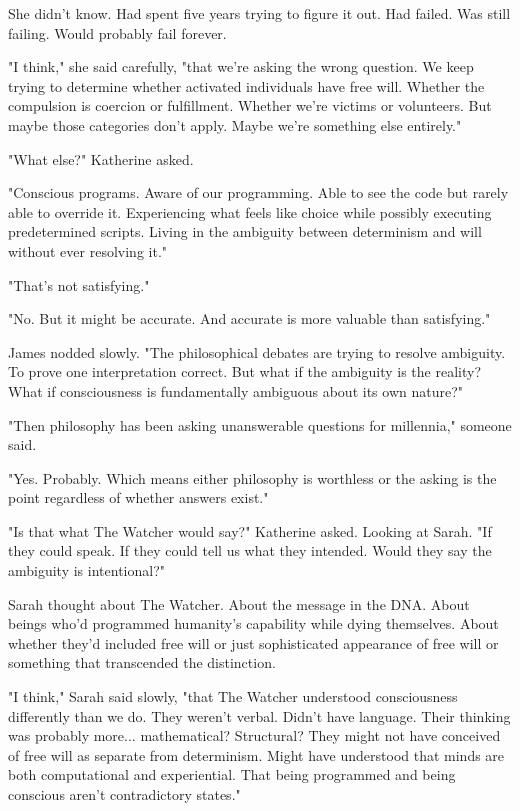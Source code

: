 She didn't know. Had spent five years trying to figure it out. Had failed. Was still failing. Would probably fail forever.

"I think," she said carefully, "that we're asking the wrong question. We keep trying to determine whether activated individuals have free will. Whether the compulsion is coercion or fulfillment. Whether we're victims or volunteers. But maybe those categories don't apply. Maybe we're something else entirely."

"What else?" Katherine asked.

"Conscious programs. Aware of our programming. Able to see the code but rarely able to override it. Experiencing what feels like choice while possibly executing predetermined scripts. Living in the ambiguity between determinism and will without ever resolving it."

"That's not satisfying."

"No. But it might be accurate. And accurate is more valuable than satisfying."

James nodded slowly. "The philosophical debates are trying to resolve ambiguity. To prove one interpretation correct. But what if the ambiguity is the reality? What if consciousness is fundamentally ambiguous about its own nature?"

"Then philosophy has been asking unanswerable questions for millennia," someone said.

"Yes. Probably. Which means either philosophy is worthless or the asking is the point regardless of whether answers exist."

"Is that what The Watcher would say?" Katherine asked. Looking at Sarah. "If they could speak. If they could tell us what they intended. Would they say the ambiguity is intentional?"

Sarah thought about The Watcher. About the message in the DNA. About beings who'd programmed humanity's capability while dying themselves. About whether they'd included free will or just sophisticated appearance of free will or something that transcended the distinction.

"I think," Sarah said slowly, "that The Watcher understood consciousness differently than we do. They weren't verbal. Didn't have language. Their thinking was probably more... mathematical? Structural? They might not have conceived of free will as separate from determinism. Might have understood that minds are both computational and experiential. That being programmed and being conscious aren't contradictory states."

